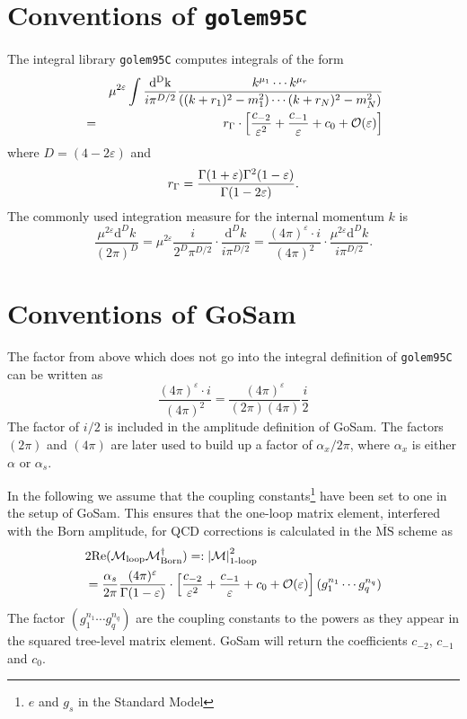 \documentclass[11pt,a4paper]{refrep}
\newcommand{\gosamversion}{{3{.}0}}
\newcommand{\gosamv}[1][\gosamversion]{{\sc GoSam}\xspace}
\newcommand{\golemVC}{{\tt golem95C}\xspace}
\newcommand{\diff}[1][{}]{{\mathrm{d}}^{#1}\!}
\newcommand{\nn}{\nonumber}
\begin{document}
\section{Conventions of \golemVC}
The integral library \golemVC{} computes integrals of the form
\begin{eqnarray}
&&\mu^{2\varepsilon}\int\frac{\mathrm{d^D k}}{i\pi^{D/2}}\frac{k^{\mu_1}\cdots k^{\mu_r}}{%
((k+r_1)^2-m_1^2)\cdots(k+r_N)^2-m_N^2)}\nn\\
&=&r_\Gamma\cdot\left[\frac{c_{-2}}{\varepsilon^2}+\frac{c_{-1}}{\varepsilon}+c_0
+{\mathcal{O}}(\varepsilon)\right]
\end{eqnarray}
where $D=(4-2\varepsilon)$ and
\begin{equation}
r_\Gamma=\frac{\Gamma(1+\varepsilon)\Gamma^2(1-\varepsilon)}{%
   \Gamma(1-2\varepsilon)}.
\end{equation}
The commonly used integration measure for the internal momentum $k$ is
\begin{equation}
\frac{\mu^{2\varepsilon}\diff[D]k}{(2\pi)^D}
=\mu^{2\varepsilon}\frac{i}{2^D\pi^{D/2}}\cdot\frac{{\mathrm d}^Dk}{i\pi^{D/2}}
=\frac{(4\pi)^\varepsilon \cdot i}{(4\pi)^2}\cdot%
 \frac{\mu^{2\varepsilon}{\mathrm d}^Dk}{i\pi^{D/2}}.
\end{equation}

\section{Conventions of \gosamv}
The factor from above which does not go into the integral definition of
\golemVC{} can be written as
\begin{equation}
\frac{(4\pi)^\varepsilon \cdot i}{(4\pi)^2}=
\frac{(4\pi)^\varepsilon}{(2\pi)(4\pi)}\frac{i}{2}
\end{equation}
The factor of $i/2$ is included in the amplitude definition of \gosamv{}.
The factors $(2\pi)$ and $(4\pi)$ are later used to build up a factor of
$\alpha_x/2\pi$, where $\alpha_x$ is either $\alpha$ or $\alpha_s$.

In the following we assume that the coupling constants\footnote{
$e$ and $g_s$ in the Standard Model} have been set to one in the
setup of \gosamv{}. This ensures that the one-loop matrix
element, interfered with the Born amplitude, for QCD corrections is calculated in the $\overline{\mathrm{MS}}$ scheme as
\begin{align}
&2{\mathrm{Re}}({\cal M}_{\mathrm{loop}}{\cal
                M}_{\mathrm{Born}}^\dagger)=:\left\vert\mathcal{M}\right\vert^2_{\text{1-loop}}\nonumber\\
  &=
\frac{\alpha_s}{2\pi}\frac{(4\pi)^\varepsilon}{\Gamma(1-\varepsilon)}
\cdot\left[\frac{c_{-2}}{\varepsilon^2}+\frac{c_{-1}}{\varepsilon}+c_0
+{\mathcal{O}}(\varepsilon)\right](g_1^{n_1}\cdots g_q^{n_q}) \label{eq:Conventions:nlo_matrix_element}
\end{align}
The factor $(g_1^{n_1}\cdots g_q^{n_q})$ are the coupling constants
to the powers as they appear in the squared tree-level matrix element. \gosamv{} will
return the coefficients $c_{-2}$, $c_{-1}$ and $c_0$.
\end{document}
